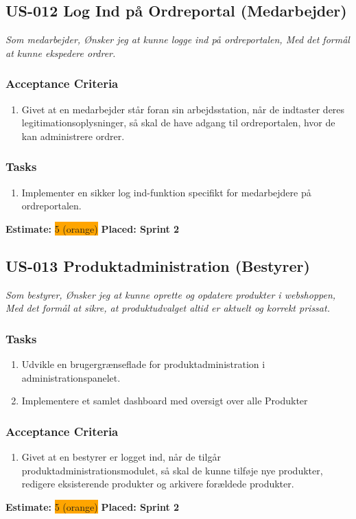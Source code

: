 \subsection{US-012 Log Ind på Ordreportal (Medarbejder)}
\label{sec:US-012}
\textit{Som medarbejder, Ønsker jeg at kunne logge ind på ordreportalen, Med det formål at kunne ekspedere ordrer.}
\subsubsection*{\textbf{Acceptance Criteria}}
\begin{enumerate}
  \item Givet at en medarbejder står foran sin arbejdsstation, når de indtaster deres legitimationsoplysninger, så skal de have adgang til ordreportalen, hvor de kan administrere ordrer.
\end{enumerate}
\subsubsection*{\textbf{Tasks}}
\begin{enumerate}
  \item Implementer en sikker log ind-funktion specifikt for medarbejdere på ordreportalen.
\end{enumerate}
\textbf{Estimate:} \colorbox{orange}{5 (orange)}
\textbf{Placed: Sprint 2}
\par\noindent\dotfill

\subsection{US-013 Produktadministration (Bestyrer)}
\label{sec:US-013}
\textit{Som bestyrer, Ønsker jeg at kunne oprette og opdatere produkter i webshoppen, Med det formål at sikre, at produktudvalget altid er aktuelt og korrekt prissat.}
\subsubsection*{\textbf{Tasks}}
\begin{enumerate}
  \item Udvikle en brugergrænseflade for produktadministration i administrationspanelet.
  \item Implementere et samlet dashboard med oversigt over alle Produkter
\end{enumerate}
\subsubsection*{\textbf{Acceptance Criteria}}
\begin{enumerate}
  \item Givet at en bestyrer er logget ind, når de tilgår produktadministrationsmodulet, så skal de kunne tilføje nye produkter, redigere eksisterende produkter og arkivere forældede produkter.
\end{enumerate}
\textbf{Estimate:} \colorbox{orange}{5 (orange)}
\textbf{Placed: Sprint 2}
\par\noindent\dotfill

